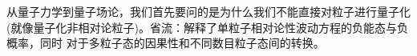 \documentclass[../main.tex]{subfiles}
\begin{document}
\hypersetup{pageanchor=true}

从量子力学到量子场论，我们首先要问的是为什么我们不能直接对粒子进行量子化(就像量子化非相对论粒子)。省流：解释了单粒子相对论性波动方程的负能态与负概率，同时
对于多粒子态的因果性和不同数目粒子态间的转换。
\end{document}
